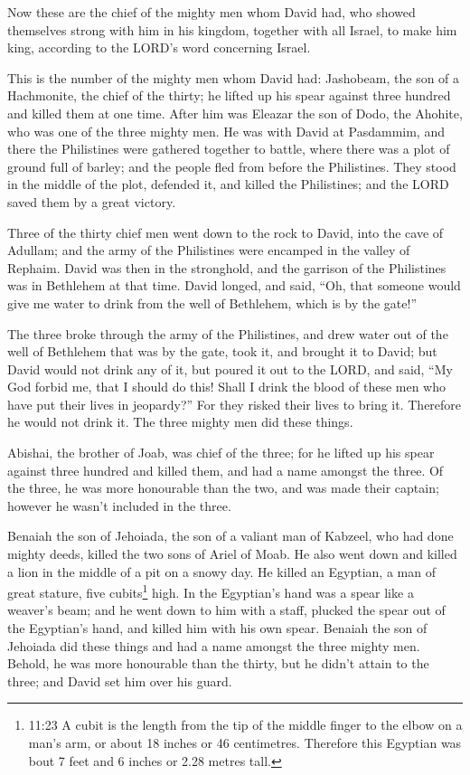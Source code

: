  Now these are the chief of the mighty men whom David had,
who showed themselves strong with him in his kingdom, together with all
Israel, to make him king, according to the LORD's word concerning
Israel.

 This is the number of the mighty men whom David had:
Jashobeam, the son of a Hachmonite, the chief of the thirty; he lifted
up his spear against three hundred and killed them at one time.
 After him was Eleazar the son of Dodo, the Ahohite, who
was one of the three mighty men.  He was with David at
Pasdammim, and there the Philistines were gathered together to battle,
where there was a plot of ground full of barley; and the people fled
from before the Philistines.  They stood in the middle of
the plot, defended it, and killed the Philistines; and the LORD saved
them by a great victory.

 Three of the thirty chief men went down to the rock to
David, into the cave of Adullam; and the army of the Philistines were
encamped in the valley of Rephaim.  David was then in the
stronghold, and the garrison of the Philistines was in Bethlehem at that
time.  David longed, and said, ``Oh, that someone would
give me water to drink from the well of Bethlehem, which is by the
gate!''

 The three broke through the army of the Philistines, and
drew water out of the well of Bethlehem that was by the gate, took it,
and brought it to David; but David would not drink any of it, but poured
it out to the LORD,  and said, ``My God forbid me, that I
should do this! Shall I drink the blood of these men who have put their
lives in jeopardy?'' For they risked their lives to bring it. Therefore
he would not drink it. The three mighty men did these things.

 Abishai, the brother of Joab, was chief of the three; for
he lifted up his spear against three hundred and killed them, and had a
name amongst the three.  Of the three, he was more
honourable than the two, and was made their captain; however he wasn't
included in the three.

 Benaiah the son of Jehoiada, the son of a valiant man of
Kabzeel, who had done mighty deeds, killed the two sons of Ariel of
Moab. He also went down and killed a lion in the middle of a pit on a
snowy day.  He killed an Egyptian, a man of great stature,
five cubits\footnote{11:23 A cubit is the length from the tip of the
  middle finger to the elbow on a man's arm, or about 18 inches or 46
  centimetres. Therefore this Egyptian was bout 7 feet and 6 inches or
  2.28 metres tall.} high. In the Egyptian's hand was a spear like a
weaver's beam; and he went down to him with a staff, plucked the spear
out of the Egyptian's hand, and killed him with his own spear.
 Benaiah the son of Jehoiada did these things and had a
name amongst the three mighty men.  Behold, he was more
honourable than the thirty, but he didn't attain to the three; and David
set him over his guard.

